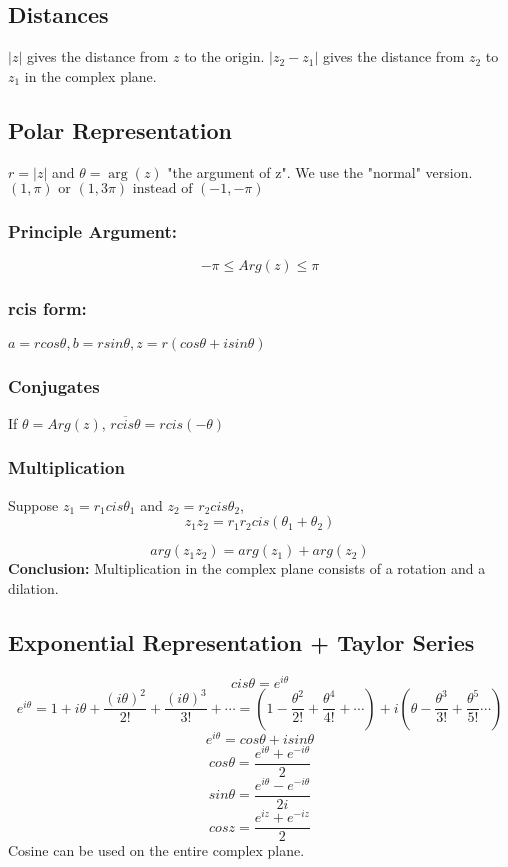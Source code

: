 \documentclass[../main.tex]{subfiles}
\begin{document}
\subsection{Distances}
    $|z|$ gives the distance from $z$ to the origin.
    $|z_{2}-z_{1}|$ gives the distance from $z_{2}$ to $z_{1}$ in the complex plane.

\subsection{Polar Representation}
    $r=|z|$ and $\theta=\arg(z)$ "the argument of z". We use the "normal" version.
    $(1, \pi) \text{ or } (1, 3\pi) \text{ instead of } (-1, -\pi)$
    
    \subsubsection{Principle Argument:}
        $$-\pi\leq Arg(z)\leq\pi$$
    
    \subsubsection{rcis form: }
        $a=rcos\theta, b=rsin\theta, z=r(cos\theta+isin\theta)$
    
    \subsubsection{Conjugates}
        If $\theta=Arg(z)$, $\overline{rcis\theta}=rcis(-\theta)$

    \subsubsection{Multiplication}
        Suppose $z_{1}=r_{1}cis\theta_{1}$ and $z_{2}=r_{2}cis\theta_{2}$,
        $$z_{1}z_{2}=r_{1}r_{2}cis(\theta_{1}+\theta_{2})$$

        $$arg(z_{1}z_{2})=arg(z_{1})+arg(z_{2})$$
        \textbf{Conclusion: } Multiplication in the complex plane consists of a rotation and a dilation.

\subsection{Exponential Representation + Taylor Series}
    $$cis\theta=e^{i\theta}$$
    $$e^{i\theta}=1+i\theta+\frac{(i\theta)^{2}}{2!}+\frac{(i\theta)^{3}}{3!}+\cdots=(1-\frac{\theta^{2}}{2!}+\frac{\theta^{4}}{4!}+\cdots)+i(\theta-\frac{\theta^{3}}{3!}+\frac{\theta^{5}}{5!}\cdots)$$
    $$e^{i\theta}=cos\theta+isin\theta$$
    $$cos\theta=\frac{e^{i\theta}+e^{-i\theta}}{2}$$
    $$sin\theta=\frac{e^{i\theta}-e^{-i\theta}}{2i}$$
    $$cosz=\frac{e^{iz}+e^{-iz}}{2}$$
    Cosine can be used on the entire complex plane.
\end{document}
